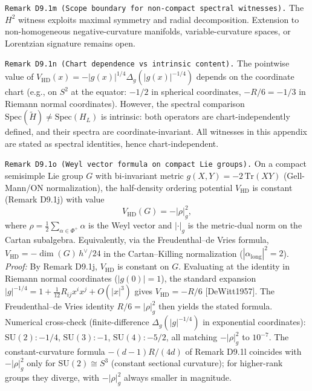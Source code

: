 \documentclass[
]{article}
\begin{document}
\texttt{Remark\ D9.1m\ (Scope\ boundary\ for\ non-compact\ spectral\ witnesses).}
The \(H^2\) witness exploits maximal symmetry and radial decomposition.
Extension to non-homogeneous negative-curvature manifolds,
variable-curvature spaces, or Lorentzian signature remains open.

\texttt{Remark\ D9.1n\ (Chart\ dependence\ vs\ intrinsic\ content).} The
pointwise value of
\(V_{\mathrm{HD}}(x)=-|g(x)|^{1/4}\Delta_g(|g(x)|^{-1/4})\) depends on
the coordinate chart (e.g., on \(S^2\) at the equator: \(-1/2\) in
spherical coordinates, \(-R/6=-1/3\) in Riemann normal coordinates).
However, the spectral comparison
\(\mathrm{Spec}(\widetilde{H})\neq\mathrm{Spec}(H_L)\) is intrinsic:
both operators are chart-independently defined, and their spectra are
coordinate-invariant. All witnesses in this appendix are stated as
spectral identities, hence chart-independent.

\texttt{Remark\ D9.1o\ (Weyl\ vector\ formula\ on\ compact\ Lie\ groups).}
On a compact semisimple Lie group \(G\) with bi-invariant metric
\(g(X,Y)=-2\,\mathrm{Tr}(XY)\) (Gell-Mann/ON normalization), the
half-density ordering potential \(V_{\mathrm{HD}}\) is constant (Remark
D9.1j) with value \[
V_{\mathrm{HD}}(G)=-|\rho|^2_g,
\] where \(\rho=\tfrac{1}{2}\sum_{\alpha\in\Phi^+}\alpha\) is the Weyl
vector and \(|\cdot|_g\) is the metric-dual norm on the Cartan
subalgebra. Equivalently, via the Freudenthal--de Vries formula,
\(V_{\mathrm{HD}}=-\dim(G)\,h^\vee/24\) in the Cartan--Killing
normalization (\(|\alpha_{\mathrm{long}}|^2=2\)). \emph{Proof:} By
Remark D9.1j, \(V_{\mathrm{HD}}\) is constant on \(G\). Evaluating at
the identity in Riemann normal coordinates (\(|g(0)|=1\)), the standard
expansion \(|g|^{-1/4}=1+\tfrac{1}{12}R_{ij}x^ix^j+O(|x|^3)\) gives
\(V_{\mathrm{HD}}=-R/6\) {[}DeWitt1957{]}. The Freudenthal--de Vries
identity \(R/6=|\rho|^2_g\) then yields the stated formula. Numerical
cross-check (finite-difference \(\Delta_g(|g|^{-1/4})\) in exponential
coordinates): \(\mathrm{SU}(2):-1/4\), \(\mathrm{SU}(3):-1\),
\(\mathrm{SU}(4):-5/2\), all matching \(-|\rho|^2_g\) to \(10^{-7}\).
The constant-curvature formula \(-(d{-}1)R/(4d)\) of Remark D9.1l
coincides with \(-|\rho|^2_g\) only for \(\mathrm{SU}(2)\cong S^3\)
(constant sectional curvature); for higher-rank groups they diverge,
with \(-|\rho|^2_g\) always smaller in magnitude.
\end{document}
